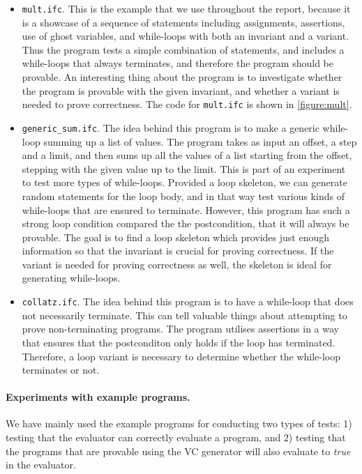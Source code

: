 \begin{itemize}
  \item {\texttt{mult.ifc}.} 
  This is the example that we use throughout the report, because it is a showcase of a sequence of statements including assignments, assertions, use of ghost variables, and while-loops with both an invariant and a variant.
  Thus the program tests a simple combination of statements, and includes a while-loops that always terminates, and therefore the program should be provable.
  An interesting thing about the program is to investigate whether the program is provable with the given invariant, and whether a variant is needed to prove correctness.
  The code for \texttt{mult.ifc} is shown in \cref{figure:mult}.
  
  \item{\texttt{generic\_sum.ifc}.}
  The idea behind this program is to make a generic while-loop summing up a list of values. 
  The program takes as input an offset, a step and a limit, and then sums up all the values of a list starting from the offset, stepping with the given value up to the limit.
  This is part of an experiment to test more types of while-loops. Provided a loop skeleton, we can generate random statements for the loop body, and in that way test various kinds of while-loops that are ensured to terminate.
  However, this program has such a strong loop condition compared the the postcondition, that it will always be provable.
  The goal is to find a loop skeleton which provides just enough information so that the invariant is crucial for proving correctness. If the variant is needed for proving correctness as well, the skeleton is ideal for generating while-loops.
  
  \item{\texttt{collatz.ifc}.}
  The idea behind this program is to have a while-loop that does not necessarily terminate.
  This can tell valuable things about attempting to prove non-terminating programs.
  The program utilises assertions in a way that ensures that the postconditon only holds if the loop has terminated.
  Therefore, a loop variant is necessary to determine whether the while-loop terminates or not.
\end{itemize}

\paragraph{Experiments with example programs.}
We have mainly used the example programs for conducting two types of tests: 1) testing that the evaluator can correctly evaluate a program, and 2) testing that the programs that are provable using the VC generator will also evaluate to \textit{true} in the evaluator.

